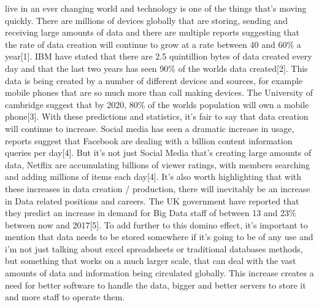 \documentclass[10pt,journal,compsoc]{IEEEtran}
\begin{document}
 live in an ever changing world and technology is one of the things that's moving quickly. There are millions of devices globally that are storing, sending and receiving large amounts of data and there are multiple reports suggesting that the rate of data creation will continue to grow at a rate between 40 and 60\% a year[1]. IBM have stated that there are 2.5 quintillion bytes of data created every day and that the last two years has seen 90\% of the worlds data created[2]. This data is being created by a number of different devices and sources, for example mobile phones that are so much more than call making devices. The University of cambridge suggest that by 2020, 80\% of the worlds population will own a mobile phone[3]. With these predictions and statistics, it's fair to say that data creation will continue to increase. Social media has seen a dramatic increase in usage, reports suggest that Facebook are dealing with a billion content information queries per day[4]. But it's not just Social Media that's creating large amounts of data, Netflix are accumulating billions of viewer ratings, with members searching and adding millions of items each day[4]. It's also worth highlighting that with these increases in data creation / production, there will inevitably be an increase in Data related positions and careers. The UK government have reported that they predict an increase in demand for Big Data staff of between 13 and 23\% between now and 2017[5]. To add further to this domino effect, it's important to mention that data needs to be stored somewhere if it's going to be of any use and i'm not just talking about excel spreadsheets or traditional databases methods, but something that works on a much larger scale, that can deal with the vast amounts of data and information being circulated globally. This increase creates a need for better software to handle the data, bigger and better servers to store it and more staff to operate them. 
\end{document}

